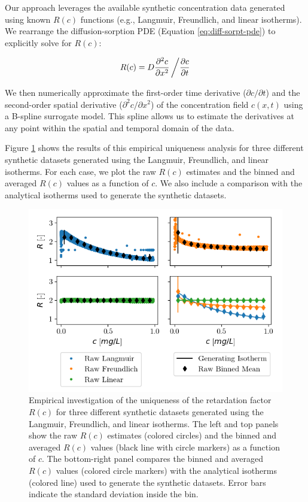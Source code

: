 Our approach leverages the available synthetic concentration data generated using known $R(c)$ functions (e.g., Langmuir, Freundlich, and linear isotherms). We rearrange the diffusion-sorption PDE (Equation \ref{eq:diff-sorpt-pde}) to explicitly solve for $R(c)$:

\begin{equation}
    R(c) = D \frac{\partial^2 c}{\partial x^2} \left/ \frac{\partial c}{\partial t} \right .
    \label{eq:rearranged_pde}
\end{equation}

We then numerically approximate the first-order time derivative ($\partial c / \partial t$) and the second-order spatial derivative ($\partial^2 c / \partial x^2$) of the concentration field $c(x,t)$ using a B-spline surrogate model. This spline allows us to estimate the derivatives at any point within the spatial and temporal domain of the data.

Figure \ref{fig:ret_uniqueness} shows the results of this empirical uniqueness analysis for three different synthetic datasets generated using the Langmuir, Freundlich, and linear isotherms. For each case, we plot the raw $R(c)$ estimates and the binned and averaged $R(c)$ values as a function of $c$. We also include a comparison with the analytical isotherms used to generate the synthetic datasets.

\begin{figure}[h]
    \centering
    \includegraphics{figs/ret_uniqueness.png}
    \caption{Empirical investigation of the uniqueness of the retardation factor $R(c)$ for three different synthetic datasets generated using the Langmuir, Freundlich, and linear isotherms. The left and top panels show the raw $R(c)$ estimates (colored circles) and the binned and averaged $R(c)$ values (black line with circle markers) as a function of $c$. The bottom-right panel compares the binned and averaged $R(c)$ values (colored circle markers) with the analytical isotherms (colored line) used to generate the synthetic datasets. Error bars indicate the standard deviation inside the bin.}
    \label{fig:ret_uniqueness}
\end{figure}

